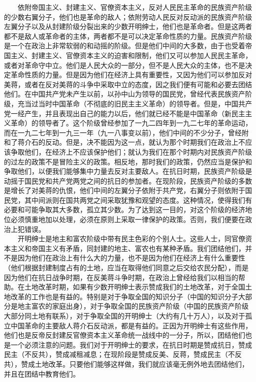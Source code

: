 \documentclass[cn,11pt,chinese]{elegantbook}
\begin{document}
　　依附帝国主义、封建主义、官僚资本主义，反对人民民主革命的民族资产阶级的少数右翼分子，他们也是革命的敌人；依附劳动人民反对反动派的民族资产阶级左翼分子以及从封建阶级分裂出来的少数开明绅士，他们也是革命者。但是这两者都不是敌人或革命者的主体，两者都不是可以决定革命性质的力量。民族资产阶级是一个在政治上非常软弱的和动摇的阶级。但是他们中间的大多数，由于也受着帝国主义、封建主义、官僚资本主义的迫害和限制，他们又可以参加人民民主革命，或者对革命守中立。他们是人民大众的一部分，但不是人民大众的主体，也不是决定革命性质的力量。但是因为他们在经济上具有重要性，又因为他们可以参加反对美蒋，或者在反对美蒋的斗争中采取中立的态度，因之我们便有可能和必要去团结他们。在中国共产党未产生以前，以孙中山为领导的国民党，曾经代表民族资产阶级，充当过当时中国革命（不彻底的旧民主主义革命）的领导者。但是，中国共产党一经产生，并且表现出自己的能力以后，他们就已经不能是中国革命（新民主主义革命）的领导者了。这个阶级曾经参加了一九二四年到一九二七年的革命运动，而在一九二七年到一九三一年（九一八事变以前），他们中间的不少分子，曾经附和了蒋介石的反动。但是，决不能因为这一点，就认为那个时期我们在政治上不应该争取他们，在经济上不应该保护他们；就认为我们在那个时期内对民族资产阶级的过左的政策不是冒险主义的政策。相反地，那时我们的政策，仍然应当是保护和争取他们，以便我们能够集中力量去反对主要敌人。在抗日时期，民族资产阶级是动摇于国民党和共产党两党之间的抗日的参加者。在现阶段，民族资产阶级的多数是增长了对美蒋的仇恨，他们中间的左翼分子依附于共产党，右翼分子则依附于国民党，其中间派则在国共两党之间采取犹豫和观望的态度。这种情况，使得我们有必要和可能争取其大多数，孤立其少数。为了达到这一目的，对这个阶级的经济地位必须慎重地加以处理，必须在原则上采取一律保护的政策。否则，我们便要在政治上犯错误。\\
　　开明绅士是地主和富农阶级中带有民主色彩的个别人士。这些人士，同官僚资本主义和帝国主义有矛盾，同封建的地主、富农也有某种矛盾。我们团结他们，并不是因为他们在政治上有什么大的力量，也不是因为他们在经济上有什么重要性（他们根据封建制度占有的土地，应当在取得他们同意之后交给农民分配），而是因为他们在抗日战争时期，在反美蒋斗争时期，在政治上曾经给我们以相当的帮助。在土地改革时期，如果有少数开明绅士表示赞成我们的土地改革，对于全国土地改革的工作也是有益的。特别是对于争取全国的知识分子（中国的知识分子大部分是地主富农的家庭出身），对于争取全国的民族资产阶级（中国的民族资产阶级大部分同土地有联系），对于争取全国的开明绅士（大约有几十万人），以及对于孤立中国革命的主要敌人蒋介石反动派，都是有益的。正因为开明绅士有这些作用，他们也是反帝反封建反官僚资本主义革命统一战线中的一分子，所以，团结他们也是一个必须注意的问题。我们对于开明绅士的要求，在抗日时期是赞成抗日，赞成民主（不反共），赞成减租减息；在现阶段是赞成反美、反蒋，赞成民主（不反共），赞成土地改革。只要他们能够这样做，我们就应该毫无例外地去团结他们，并且在团结中教育他们。\\
\end{document}
